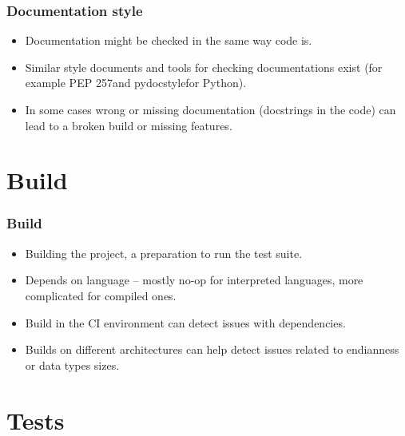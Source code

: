 \documentclass[aspectratio=169]{beamer}
\begin{document}
\begin{frame}
	\frametitle{Documentation style}
	
	\begin{block}{}
		\begin{itemize}
			\item Documentation might be checked in the same way code is.
			\item Similar style documents and tools for checking documentations exist (for example PEP 257\footnotemark and pydocstyle\footnotemark for Python).
			\item In some cases wrong or missing documentation (docstrings in the code) can lead to a broken build or missing features.
		\end{itemize}
	\end{block}

\end{frame}

\section{Build}

\begin{frame}
	\frametitle{Build}
	
	\begin{block}{}
		\begin{itemize}
			\item Building the project, a preparation to run the test suite.
			\item Depends on language -- mostly no-op for interpreted languages, more complicated for compiled ones.
			\item Build in the CI environment can detect issues with dependencies.
			\item Builds on different architectures can help detect issues related to endianness or data types sizes.
		\end{itemize}
	\end{block}
\end{frame}

\section{Tests}
\end{document}
